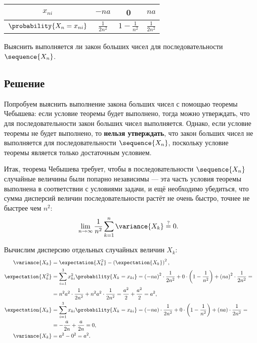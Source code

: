 \begin{tabular}{|c|c|c|c|}
    \hline
    $x_{ni}$                     & $-n a$            & 0                   & $na$             \\
    \hline
    $\probability{X_n = x_{ni}}$ & $\frac{1}{2 n^2}$ & $1 - \frac{1}{n^2}$ & $\frac{1}{2n^2}$ \\
    \hline
\end{tabular}

Выяснить выполняется ли закон больших чисел для последовательности $\sequence{X_n}$.

\subsection*{Решение}
Попробуем выяснить выполнение закона больших чисел с помощью теоремы Чебышева: если условие теоремы будет выполнено,
тогда можно утверждать, что для последовательности закон больших чисел выполняется. Однако, если условие теоремы не будет выполнено, то
\textbf{нельзя утверждать}, что закон больших чисел не выполняется для последовательности $\sequence{X_n}$, поскольку условие теоремы является только достаточным условием.

Итак, теорема Чебышева требует, чтобы в последовательности $\sequence{X_n}$ случайные величины были попарно независимы --- эта часть условия
теоремы выполнена в соответствии с условиями задачи, и ещё необходимо убедиться, что сумма дисперсий величин последовательности растёт не очень быстро,
точнее не быстрее чем $n^2$:
\begin{equation}
    \lim_{n \rightarrow \infty} \frac{1}{n^2} \sum_{k=1}^n \variance{X_k} \stackrel{?}{=} 0 .
\end{equation}

Вычислим дисперсию отдельных случайных величин $X_k$:
\begin{align}
    \variance{X_k} & = \expectation{X_k^2} - \left ( \expectation{X_k} \right )^2 , \\
    \expectation{X_k^2}
    & = \sum_{i=1}^3 x_{ki}^2 \probability{X_k = x_{ki}}
    = \left ( -na \right )^2 \cdot \frac{1}{2 n^2} + 0 \cdot \left ( 1 - \frac{1}{n^2} \right ) + \left ( na \right )^2 \cdot \frac{1}{2 n^2} = \notag \\
    & = n^2 a^2 \cdot \frac{1}{2 n^2} + n^2 a^2 \cdot \frac{1}{2 n^2}
    = \frac{a^2}{2} + \frac{a^2}{2} = a^2 , \\
    \expectation{X_k}
    & = \sum_{i=1}^3 x_{ki} \probability{X_k = x_{ki}}
    = \left ( -na \right ) \cdot \frac{1}{2 n^2} + 0 \cdot \left ( 1 - \frac{1}{n^2} \right ) + \left ( na \right ) \cdot \frac{1}{2 n^2} = \notag \\
    & = - \frac{a}{2 n} + \frac{a}{2 n} = 0,\\
    \variance{X_k} & = a^2 - 0^2 = a^2 .
\end{align}

